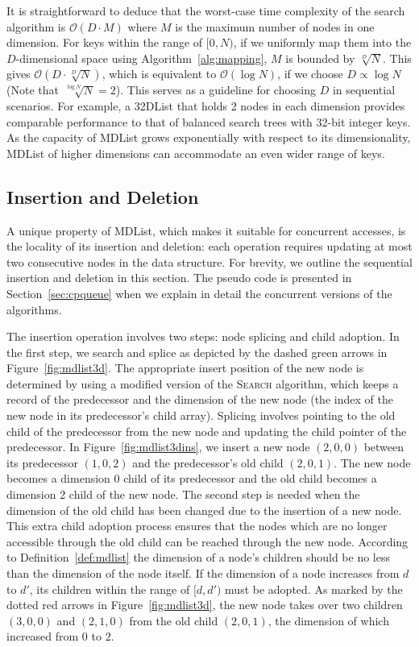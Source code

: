 \documentclass[10pt,journal,letterpaper,compsoc]{IEEEtran}
\begin{document}
It is straightforward to deduce that the worst-case time complexity of the search algorithm is $\mathcal{O}(D \cdot M)$ where $M$ is the maximum number of nodes in one dimension.
For keys within the range of $[0,N)$, if we uniformly map them into the $D$-dimensional space using Algorithm~\ref{alg:mapping}, $M$ is bounded by $\sqrt[D]{N}$.
    This gives $\mathcal{O}(D \cdot \sqrt[D]{N})$, which is equivalent to $\mathcal{O}(\log{N})$, if we choose $D \propto \log{N}$ (Note that $\sqrt[\log{N}]{N}=2$).
This serves as a guideline for choosing $D$ in sequential scenarios. 
For example, a 32DList that holds 2 nodes in each dimension provides comparable performance to that of balanced search trees with 32-bit integer keys.
As the capacity of MDList grows exponentially with respect to its dimensionality, MDList of higher dimensions can accommodate an even wider range of keys.  

\subsection{Insertion and Deletion}
\label{sec:mdlistinsdel}
A unique property of MDList, which makes it suitable for concurrent accesses, is the locality of its insertion and deletion: each operation requires updating at most two consecutive nodes in the data structure. 
For brevity, we outline the sequential insertion and deletion in this section. 
The pseudo code is presented in Section~\ref{sec:cpqueue} when we explain in detail the concurrent versions of the algorithms.

The insertion operation involves two steps: node splicing and child adoption.
In the first step, we search and splice as depicted by the dashed green arrows in Figure~\ref{fig:mdlist3d}.
The appropriate insert position of the new node is determined by using a modified version of the \textsc{Search} algorithm, which keeps a record of the predecessor and the dimension of the new node (the index of the new node in its predecessor's child array).
Splicing involves pointing to the old child of the predecessor from the new node and updating the child pointer of the predecessor.
In Figure~\ref{fig:mdlist3dins}, we insert a new node $(2,0,0)$ between its predecessor $(1,0,2)$ and the predecessor's old child $(2,0,1)$.
The new node becomes a dimension 0 child of its predecessor and the old child becomes a dimension 2 child of the new node.
The second step is needed when the dimension of the old child has been changed due to the insertion of a new node.
This extra child adoption process ensures that the nodes which are no longer accessible through the old child can be reached through the new node.
According to Definition~\ref{def:mdlist} the dimension of a node's children should be no less than the dimension of the node itself.
If the dimension of a node increases from $d$ to $d'$, its children within the range of $[d,d')$ must be adopted.
As marked by the dotted red arrows in Figure~\ref{fig:mdlist3d}, the new node takes over two children $(3,0,0)$ and $(2,1,0)$ from the old child $(2,0,1)$, the dimension of which increased from 0 to 2. 
\end{document}
